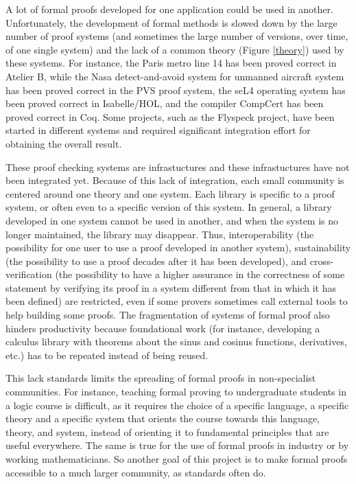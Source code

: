 A lot of formal proofs developed for one application could be used in
another.  Unfortunately, the development of formal methods is slowed
down by the large number of proof systems (and sometimes the large
number of versions, over time, of one single system) and the lack of a
common theory (Figure \ref{theory}) used by these systems.  For
instance, the Paris metro line 14 has been proved correct in {\sc
  Atelier B}, while the Nasa detect-and-avoid system for unmanned
aircraft system has been proved correct in the {\sc PVS} proof system,
the seL4 operating system has been proved correct in {\sc
  Isabelle/HOL}, and the compiler CompCert has been proved correct in
{\sc Coq}.  Some projects, such as the Flyspeck project, have been
started in different systems and required significant integration
effort for obtaining the overall result.

These proof checking systems are infrastuctures and these
infrastuctures have not been integrated yet.  Because of this lack of
integration, each small community is centered around one theory and
one system. Each library is specific to a proof system, or often even
to a specific version of this system. In general, a library developed
in one system cannot be used in another, and when the system is no
longer maintained, the library may disappear.  Thus, interoperability
(the possibility for one user to use a proof developed in another
system), sustainability (the possibility to use a proof decades after
it has been developed), and cross-verification (the possibility to
have a higher assurance in the correctness of some statement by
verifying its proof in a system different from that in which it has
been defined) are restricted, even if some provers sometimes call
external tools to help building some proofs. The fragmentation of
systems of formal proof also hinders productivity because foundational
work (for instance, developing a calculus library with theorems about
the sinus and cosinus functions, derivatives, etc.) has to be repeated
instead of being reused.

This lack standards limits the spreading of formal proofs in
non-specialist communities. For instance, teaching formal proving to
undergraduate students in a logic course is difficult, as it requires
the choice of a specific language, a specific theory and a specific
system that orients the course towards this language, theory, and
system, instead of orienting it to fundamental principles that are
useful everywhere. The same is true for the use of formal proofs in
industry or by working mathematicians. So another goal of this project
is to make formal proofs accessible to a much larger community, as
standards often do.

